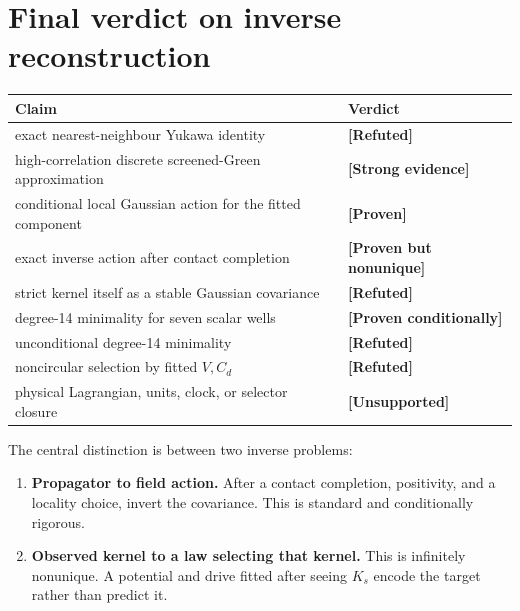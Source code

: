 \documentclass[11pt,a4paper,openany]{report}
\newcommand{\statusProven}{\textcolor{fingreen}{[Proven]}}
\newcommand{\statusStrong}{\textcolor{finblue}{[Strong evidence]}}
\newcommand{\statusRefuted}{\textcolor{finred}{[Refuted]}}
\begin{document}
\section{Final verdict on inverse reconstruction}

\begin{center}
\begingroup\small
\setlength{\tabcolsep}{3.5pt}
\renewcommand{\arraystretch}{1.16}
\begin{longtable}{@{}p{}p{}@{}}
\toprule
\textbf{Claim} & \textbf{Verdict} \\
\midrule
\endhead
exact nearest-neighbour Yukawa identity & \textbf{\statusRefuted{}} \\
high-correlation discrete screened-Green approximation & \textbf{\statusStrong{}} \\
conditional local Gaussian action for the fitted component & \textbf{\statusProven{}} \\
exact inverse action after contact completion & \textbf{[Proven but nonunique]} \\
strict kernel itself as a stable Gaussian covariance & \textbf{\statusRefuted{}} \\
degree-14 minimality for seven scalar wells & \textbf{[Proven conditionally]} \\
unconditional degree-14 minimality & \textbf{\statusRefuted{}} \\
noncircular selection by fitted \(V,C_d\) & \textbf{\statusRefuted{}} \\
physical Lagrangian, units, clock, or selector closure & \textbf{[Unsupported]} \\
\bottomrule
\end{longtable}
\endgroup
\end{center}

The central distinction is between two inverse problems:

\begin{enumerate}
\item 
\textbf{Propagator to field action.} After a contact completion, positivity, and a locality choice, invert the covariance. This is standard and conditionally rigorous.

\item 
\textbf{Observed kernel to a law selecting that kernel.} This is infinitely nonunique. A potential and drive fitted after seeing \(K_s\) encode the target rather than predict it.

\end{enumerate}
\end{document}
